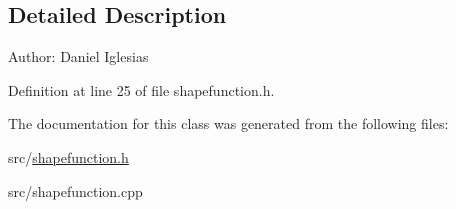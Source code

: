 \subsection{Detailed Description}
\begin{Desc}
\item[Author:]Daniel Iglesias \end{Desc}


Definition at line 25 of file shapefunction.h.

The documentation for this class was generated from the following files:\begin{CompactItemize}
\item 
src/\hyperlink{shapefunction_8h}{shapefunction.h}\item 
src/shapefunction.cpp\end{CompactItemize}

